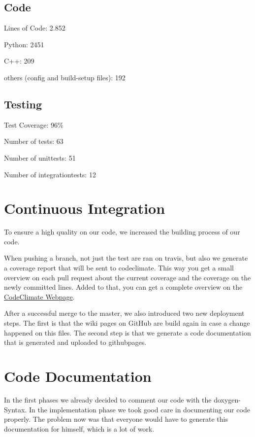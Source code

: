 \documentclass[parskip=full]{scrartcl}
\begin{document}
\subsection{Code}
Lines of Code: 2.852

Python: 2451

C++: 209

others (config and build-setup files): 192

\subsection{Testing}

Test Coverage: 96\%

Number of tests: 63

Number of \glspl{unittest}: 51

Number of \glspl{integrationtest}: 12

\newpage

\section{Continuous Integration}

To ensure a high quality on our code, we increased the building process of our code.

When pushing a branch, not just the test are ran on \gls{travis}, but also we generate a coverage report that will be sent to \gls{codeclimate}.
This way you get a small overview on each pull request about the current coverage and the coverage on the newly committed lines.
Added to that, you can get a complete overview on the
\href{https://codeclimate.com/github/TheSlimvReal/PSE---LA-meets-ML}{CodeClimate Webpage}.

After a successful merge to the master, we also introduced two new deployment steps.
The first is that the wiki pages on GitHub are build again in case a change happened on this files.
The second step is that we generate a code documentation that is generated and uploaded to \gls{githubpages}.

\newpage



\section{Code Documentation}

In the first phases we already decided to comment our code with the \gls{doxygen}-Syntax.
In the implementation phase we took good care in documenting our code properly.
The problem now was that everyone would have to generate this documentation for himself, which is a lot of work.
\end{document}
